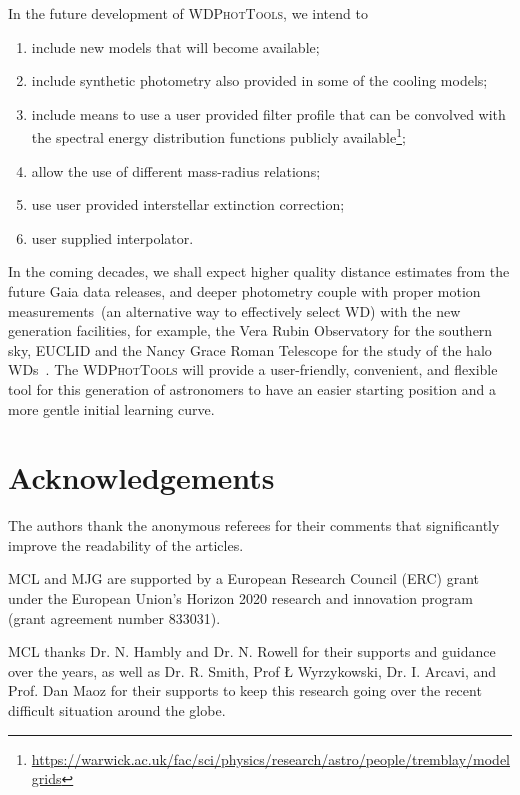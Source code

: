 \documentclass[fleqn,usenatbib]{rasti}
\begin{document}
In the future development of \textsc{WDPhotTools}, we intend to
\begin{enumerate}
    \item include new models that will become available;
    \item include synthetic photometry also provided in some of the cooling models;
    \item include means to use a user provided filter profile that can be convolved with the spectral energy distribution functions publicly available\footnote{\url{https://warwick.ac.uk/fac/sci/physics/research/astro/people/tremblay/modelgrids}};
    \item allow the use of different mass-radius relations;
    \item use user provided interstellar extinction correction;
    \item user supplied interpolator.
\end{enumerate}


In the coming decades, we shall expect higher quality distance estimates from
the future Gaia data releases, and deeper photometry couple with proper
motion measurements~(an alternative way to effectively select WD) with the
new generation facilities, for example, the Vera Rubin Observatory for the
southern sky, EUCLID and the Nancy Grace Roman Telescope for the study of the
halo WDs~\citep{2020ApJ...900..139F}. The \textsc{WDPhotTools}
will provide a user-friendly, convenient, and flexible tool for this
generation of astronomers to have an easier starting position and a more
gentle initial learning curve.

\section*{Acknowledgements}
The authors thank the anonymous referees for their comments that significantly
improve the readability of the articles.

MCL and MJG are supported by a European Research Council (ERC) grant under the European
Union’s Horizon 2020 research and innovation program (grant agreement number
833031).

MCL thanks Dr. N. Hambly and Dr. N. Rowell for their supports and guidance over
the years, as well as Dr. R. Smith, Prof \L{} Wyrzykowski, Dr. I. Arcavi,
and Prof. Dan Maoz for their supports to keep this research going over the
recent difficult situation around the globe.
\end{document}
